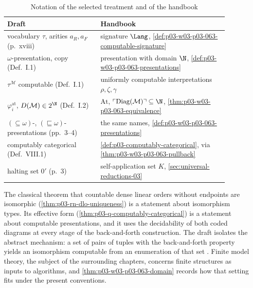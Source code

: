 \begin{table}[ht]
\centering
\small
\begin{tabular}{p{0.38\linewidth}p{0.52\linewidth}}
\toprule
Draft \cite{Montalban2019CSTDraft} & Handbook \\
\midrule
vocabulary \(\tau\), arities \(a_R,a_F\) (p.~xviii) & signature \(\Lang\), \cref{def:p03-w03-p03-063-computable-signature} \\
\(\omega\)-presentation, copy (Def.~I.1) & presentation with domain \(\N\), \cref{def:p03-w03-p03-063-presentations} \\
\(\tau^{\mathcal M}\) computable (Def.~I.1) & uniformly computable interpretations \(\rho,\zeta,\gamma\) \\
\(\varphi^{\mathrm{at}}_i\), \(D(\mathcal M)\in2^{\N}\) (Def.~I.2) & \(\mathrm{At}\), \(\ulcorner\operatorname{Diag}(\mathcal M)\urcorner\subseteq\N\), \cref{thm:p03-w03-p03-063-equivalence} \\
\((\subseteq\omega)\)-, \((\sqsubseteq\omega)\)-presentations (pp.~3--4) & the same names, \cref{def:p03-w03-p03-063-presentations} \\
computably categorical (Def.~VIII.1) & \cref{def:p03-computably-categorical}, via \cref{thm:p03-w03-p03-063-pullback} \\
halting set \(0'\) (p.~3) & self-application set \(K\), \cref{sec:universal-reductions-03} \\
\bottomrule
\end{tabular}
\caption{Notation of the selected treatment and of the handbook}
\label{tab:p03-w03-p03-063-bridge}
\end{table}

The classical theorem that countable dense linear orders without endpoints
are isomorphic (\cref{thm:p03-rn-dlo-uniqueness}) is a statement about
isomorphism types.  Its effective form (\cref{thm:p03-q-computably-categorical})
is a statement about computable presentations, and it uses the decidability of
both coded diagrams at every stage of the back-and-forth construction.  The
draft isolates the abstract mechanism: a set of pairs of tuples with the
back-and-forth property yields an isomorphism computable from an enumeration
of that set \cite[Lemma~III.15, p.~40]{Montalban2019CSTDraft}.  Finite model
theory, the subject of the surrounding chapters, concerns finite structures
as inputs to algorithms, and \cref{thm:p03-w03-p03-063-domain} records how
that setting fits under the present conventions.
